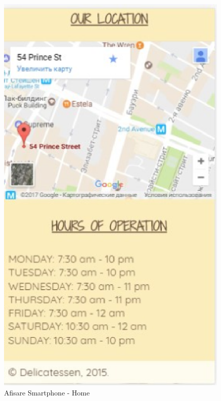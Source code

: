 \documentclass[11pt]{article}
\begin{document}
\begin{figure}[h]
\includegraphics{images/76.eps}
\caption{Afisare Smartphone - Home}
\end{figure}
\end{document}
